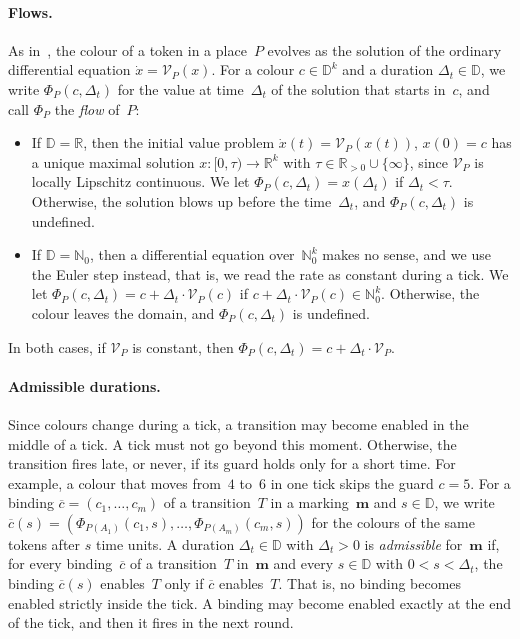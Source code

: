 \documentclass[11pt]{article}
\theoremstyle{definition}
\newcommand{\NatZero}{\mathbb{N}_0}
\newcommand{\Real}{\mathbb{R}}
\newcommand{\Dom}{\mathbb{D}}
\newcommand{\cvec}{\overline{c}}
\newcommand{\bfm}{\mathbf{m}}
\begin{document}
\paragraph{Flows.}
As in~\cite{EverdijBlom2005}, the colour of a token in a place~$P$ evolves as
the solution of the ordinary differential equation $\dot{x} =
\mathcal{V}_P(x)$. For a colour $c \in \Dom^k$ and a duration $\Delta_t \in \Dom$, we
write $\Phi_P(c, \Delta_t)$ for the value at time~$\Delta_t$ of the solution that starts
in~$c$, and call $\Phi_P$ the \emph{flow} of~$P$:
\begin{itemize}
  \item If $\Dom = \Real$, then the initial value problem
    $\dot{x}(t) = \mathcal{V}_P(x(t))$, $x(0) = c$ has a unique maximal
    solution $x : [0, \tau) \to \Real^k$ with $\tau \in \Real_{> 0} \cup
    \{\infty\}$, since $\mathcal{V}_P$ is locally Lipschitz continuous. We
    let $\Phi_P(c, \Delta_t) = x(\Delta_t)$ if $\Delta_t < \tau$. Otherwise, the solution blows up
    before the time~$\Delta_t$, and $\Phi_P(c, \Delta_t)$ is undefined.
  \item If $\Dom = \NatZero$, then a differential equation over~$\NatZero^k$
    makes no sense, and we use the Euler step instead, that is, we read the
    rate as constant during a tick. We let $\Phi_P(c, \Delta_t) = c + \Delta_t \cdot
    \mathcal{V}_P(c)$ if $c + \Delta_t \cdot \mathcal{V}_P(c) \in \NatZero^k$.
    Otherwise, the colour leaves the domain, and $\Phi_P(c, \Delta_t)$ is
    undefined.
\end{itemize}
In both cases, if $\mathcal{V}_P$ is constant, then
$\Phi_P(c, \Delta_t) = c + \Delta_t \cdot \mathcal{V}_P$.

\paragraph{Admissible durations.}
Since colours change during a tick, a transition may become enabled in the
middle of a tick. A tick must not go beyond this moment. Otherwise, the
transition fires late, or never, if its guard holds only for a short time.
For example, a colour that moves from~$4$ to~$6$ in one tick skips the guard
$c = 5$. For a binding $\cvec = (c_1, \dots, c_m)$ of a transition~$T$ in a
marking~$\bfm$ and $s \in \Dom$, we write
$\cvec(s) = (\Phi_{P(A_1)}(c_1, s), \dots, \Phi_{P(A_m)}(c_m, s))$ for the
colours of the same tokens after $s$ time units. A duration $\Delta_t \in \Dom$
with $\Delta_t > 0$ is \emph{admissible} for~$\bfm$ if, for every
binding~$\cvec$ of a transition~$T$ in~$\bfm$ and every $s \in \Dom$ with
$0 < s < \Delta_t$, the binding $\cvec(s)$ enables~$T$ only if $\cvec$
enables~$T$. That is, no binding becomes enabled strictly inside the tick. A
binding may become enabled exactly at the end of the tick, and then it fires
in the next round.
\end{document}
